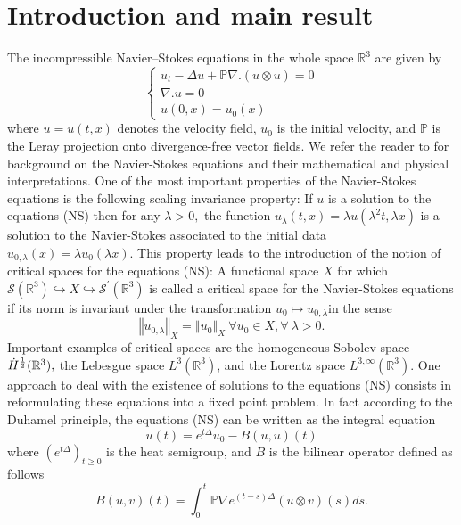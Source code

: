 \documentclass[11pt]{amsart}%
\theoremstyle{plain}
\numberwithin{equation}{section}
\begin{document}
\section{Introduction and  main result}
The incompressible Navier--Stokes equations in the whole space $\mathbb{R}^3$ are given by
\begin{equation}
\left\{
\begin{array}{l}
u_{t}-\Delta u+\mathbb{P}\nabla .(u\otimes u)=0 \\
\nabla .u=0 \\
u(0,x)=u_{0}(x)%
\end{array}%
\right.   \tag{NS}
\end{equation}%
where $u=u(t,x)$ denotes the velocity field, $u_0$ is the initial velocity, and $\mathbb{P}$ is the Leray projection onto divergence-free vector fields. We refer the reader to \cite{Lem3,Can} for background on the Navier-Stokes equations and their mathematical and physical interpretations.
One of the most important properties of the Navier-Stokes equations is  the
following scaling invariance property: If $u$ is a solution to the equations (NS)
then for any $\lambda >0,$ the function $u_{\lambda }(t,x)=\lambda u(\lambda
^{2}t,\lambda x)$ is a solution to the Navier-Stokes associated to the
initial data $u_{0,\lambda }(x)=\lambda u_{0}(\lambda x).$ This property leads to the introduction of the notion of critical spaces for the equations (NS): A functional
space $X$ for which $ \mathcal{S}(\mathbb{R}^3)\hookrightarrow X\hookrightarrow \mathcal{S}^\prime(\mathbb{R}^3)$
is called a critical space for the Navier-Stokes equations if its norm is
invariant under the transformation $u_{0}\mapsto u_{0,\lambda }$in the sense%
\[
\left\Vert u_{0,\lambda }\right\Vert _{X}=\left\Vert u_{0}\right\Vert
_{X}~\forall u_{0}\in X,\forall ~\lambda >0.
\]%
Important examples of critical spaces are the homogeneous Sobolev space $\dot{H}^{%
\frac{1}{2}}(\mathbb{R}^{3}),$ the Lebesgue space $L^{3}(\mathbb{R}^{3})$,
and the Lorentz space $L^{3,\infty }(\mathbb{R}^{3}).$
One approach to deal with the existence of solutions to the equations (NS) consists in reformulating these equations into a fixed point problem. In fact according to the Duhamel principle, the equations (NS) can be written as the integral equation
\begin{equation}
u(t)=e^{t\Delta }u_{0}-B(u,u)(t)  \label{eq2}
\end{equation}
where $(e^{t\Delta })_{t\geq 0}$ is the heat semigroup, and $B$ is the
bilinear operator defined as follows%
\begin{equation}
B(u,v)(t)=\int_{0}^{t}\mathbb{P}\nabla e^{(t-s)\Delta }(u\otimes v)(s)ds.
\label{eq3}
\end{equation}%
\end{document}
